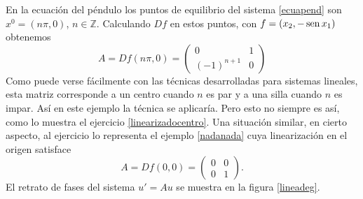En la ecuación del péndulo los puntos de equilibrio del sistema
\eqref{ecuapend} son $x^0=(n\pi,0)$, $n\in\mathbb{Z}$. Calculando
$Df$ en estos puntos, con $f=(x_2,-\sen x_1)$ obtenemos
\begin{equation}\label{lineapend}
    A=Df(n\pi,0)=\begin{pmatrix}
      0 & 1 \\
      (-1)^{n+1} & 0
    \end{pmatrix}
\end{equation}
Como puede verse fácilmente con las técnicas desarrolladas para
sistemas lineales, esta matriz corresponde a un centro cuando $n$
es par y a una silla cuando $n$ es impar. Así en este ejemplo la
técnica se aplicaría. Pero esto no siempre es así, como lo muestra
el ejercicio \ref{linearizadocentro}. Una situación similar, en
cierto aspecto, al ejercicio lo representa el ejemplo
\ref{nadanada} cuya linearización en el origen satisface
\[
    A=Df(0,0)=\begin{pmatrix}
      0 & 0 \\
      0 & 1
    \end{pmatrix}.
\]
El retrato de fases del sistema $u'=Au$ se muestra en la figura
\ref{lineadeg}.
